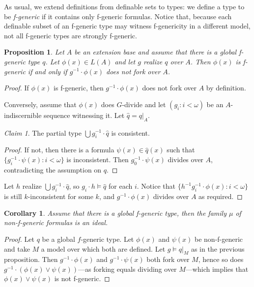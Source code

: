 \documentclass[12pt]{article}
\newtheorem{cor}[thm]{Corollary}
\newtheorem{prop}[thm]{Proposition}
\theoremstyle{definition}
\theoremstyle{mystyle}
\theoremstyle{remark}
\newtheorem*{claim}{Claim}
\newenvironment{claimproof}
    {\begin{proof}}{\renewcommand\qedsymbol{\Squarepipe} \end{proof}}
\begin{document}
As usual, we extend definitions from definable sets to types: we
define a type to be \emph{f-generic} if it contains only f-generic
formulas. Notice that, because each definable subset of an
f-generic type may witness f-genericity in a different model, not
all f-generic types are strongly f-generic.




\begin{prop}\label{prop_fundweak}
Let $A$ be an extension base and assume that there is a global f-generic type $q$. Let $\phi(x)\in L(A)$ and let $g$ realize $q$ over $A$. Then $\phi(x)$ is f-generic if and only if $g^{-1}\cdot \phi(x)$ does not fork over $A$.
\end{prop}
\begin{proof}
If $\phi(x)$ is f-generic, then $g^{-1}\cdot \phi(x)$ does not fork over $A$ by definition.

Conversely, assume that $\phi(x)$ does $G$-divide and let $(g_i:i<\omega)$ be an $A$-indiscernible sequence witnessing it. Let $\hat q = q|_A$.

\begin{claim} The partial type $\bigcup g_i^{-1}\cdot \hat q$ is consistent.
\end{claim}

\begin{claimproof}
If not, then there is a formula $\psi(x)\in \hat q(x)$ such that $\{g_i^{-1}\cdot \psi(x):i<\omega\}$ is inconsistent. Then $g_0^{-1}\cdot \psi(x)$ divides over $A$, contradicting the assumption on $q$.
\end{claimproof}

Let $h$ realize $\bigcup g_i^{-1}\cdot \hat q$, so $g_i\cdot h \models \hat q$ for each $i$. Notice that $\{h^{-1}g_i^{-1} \cdot \phi(x):i<\omega\}$ is still $k$-inconsistent for some $k$, and $g^{-1}\cdot \phi(x)$ divides over $A$ as required.
\end{proof}

\begin{cor}
Assume that there is a global f-generic type, then the family $\mu$ of non-f-generic formulas is an ideal.
\end{cor}
\begin{proof}
Let $q$ be a global $f$-generic type.
Let $\phi(x)$ and $\psi(x)$ be non-f-generic and take $M$ a model over which both are defined. Let $g\models q|_M$ as in the previous proposition. Then $g^{-1}\cdot \phi(x)$ and $g^{-1}\cdot \psi(x)$ both fork over $M$, hence so does $g^{-1}\cdot (\phi(x)\vee \psi(x))$---as forking equals dividing over $M$---which implies that $\phi(x)\vee \psi(x)$ is not f-generic.
\end{proof}
\end{document}
